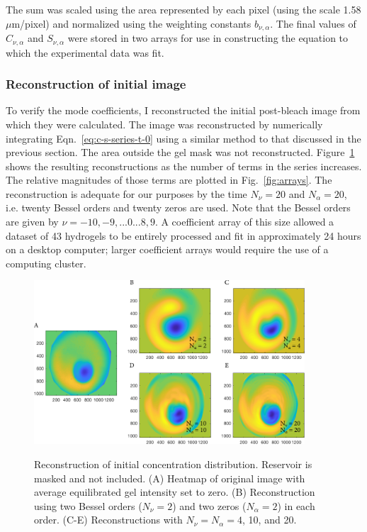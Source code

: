 The sum was scaled using the area represented by each pixel (using the scale 1.58 $\mu$m/pixel) and normalized using the weighting constants $b_{\nu,\alpha}$.  The final values of $C_{\nu,\alpha}$ and $S_{\nu,\alpha}$ were stored in two arrays for use in constructing the equation to which the experimental data was fit.


\subsubsection{Reconstruction of initial image}

To verify the mode coefficients, I reconstructed the initial post-bleach image from which they were calculated.  The image was reconstructed by numerically integrating Eqn.~\ref{eq:c-s-series-t-0} using a similar method to that discussed in the previous section.  The area outside the gel mask was not reconstructed.  Figure~\ref{fig:initDist} shows the resulting reconstructions as the number of terms in the series increases.  The relative magnitudes of those terms are plotted in Fig.~\ref{fig:arrays}.  The reconstruction is adequate for our purposes by the time $N_\nu = 20$ and $N_\alpha = 20$, i.e. twenty Bessel orders and twenty zeros are used.  Note that the Bessel orders are given by $\nu = -10,-9,...0...8,9$.  A coefficient array of this size allowed a dataset of 43 hydrogels to be entirely processed and fit in approximately 24 hours on a desktop computer; larger coefficient arrays would require the use of a computing cluster.

\begin{figure}
\caption[Reconstruction of initial concentration distribution.]{Reconstruction of initial concentration distribution. Reservoir is masked and not included.  (A) Heatmap of original image with average equilibrated gel intensity set to zero. (B) Reconstruction using two Bessel orders ($N_\nu = 2$) and two zeros ($N_\alpha = 2$) in each order. (C-E) Reconstructions with $N_\nu = N_\alpha = 4$, 10, and 20.}
\centering
\includegraphics[width=0.9\textwidth]{figs/ch04/reconstruction-16_2_4_10_20.pdf}
\label{fig:initDist}
\end{figure} 


